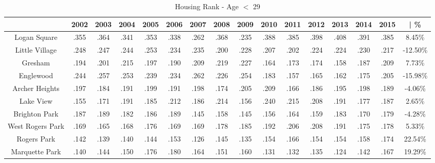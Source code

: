 \documentclass{article}
\theoremstyle{definition}
\theoremstyle{remark}
\begin{document}
\begin{table}[h]\centering
\caption{Housing Rank - Age $<$ 29}\label{thelabel}
\begin{adjustbox}{center}
\begin{tabular}{||c | c c c c c c c c c c c c c c | c ||} 
 \hline
 & 2002 & 2003 & 2004 & 2005 & 2006 & 2007 & 2008 & 2009 & 2010 & 2011 & 2012 & 2013 & 2014 & 2015 & | \%\\[0.5ex] 
 \hline\hline
Logan Square & .355 & .364 & .341 & .353 & .338 & .262 & .368 & .235 & .388 & .385 & .398 & .408 & .391 & .385 & 8.45\% \\
Little Village & .248 & .247 & .244 & .253 & .234 & .235 & .200 & .228 & .207 & .202 & .224 & .224 & .230 & .217 & -12.50\% \\
Gresham & .194 & .201 & .215 & .197 & .190 & .209 & .219 & .227 & .164 & .173 & .174 & .158 & .187 & .209 & 7.73\% \\
Englewood & .244 & .257 & .253 & .239 & .234 & .262 & .226 & .254 & .183 & .157 & .165 & .162 & .175 & .205 & -15.98\% \\
Archer Heights & .197 & .184 & .191 & .199 & .191 & .198 & .174 & .205 & .209 & .166 & .186 & .195 & .198 & .189 & -4.06\% \\
Lake View & .155 & .171 & .191 & .185 & .212 & .186 & .214 & .156 & .240 & .215 & .208 & .191 & .177 & .187 & 2.65\% \\
Brighton Park & .187 & .189 & .182 & .186 & .189 & .145 & .158 & .145 & .156 & .164 & .159 & .183 & .170 & .179 & -4.28\% \\
West Rogers Park & .169 & .165 & .168 & .176 & .169 & .169 & .178 & .185 & .192 & .206 & .208 & .191 & .175 & .178 & 5.33\% \\
Rogers Park & .142 & .139 & .140 & .144 & .153 & .126 & .145 & .135 & .154 & .166 & .154 & .154 & .158 & .174 & 22.54\% \\
Marquette Park & .140 & .144 & .150 & .176 & .180 & .164 & .151 & .160 & .131 & .132 & .135 & .124 & .142 & .167 & 19.29\% \\
 \hline
 \end{tabular}

\end{adjustbox}
 \end{table}
 
\end{document}
